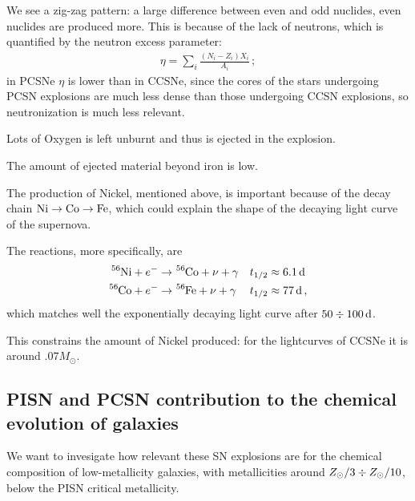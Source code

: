 \documentclass[main.tex]{subfiles}
\begin{document}
We see a zig-zag pattern: a large difference between even and odd nuclides,
even nuclides are produced more.
This is because of the lack of neutrons, which is quantified by the neutron excess parameter: 
%
\begin{align}
\eta = \sum _{i} \frac{(N_i - Z_i)X_i}{A_i}
\,;
\end{align}
%
in PCSNe \(\eta \) is lower than in CCSNe, since 
the cores of the stars undergoing PCSN explosions are much less dense than those undergoing CCSN explosions, so neutronization is much less relevant.

Lots of Oxygen is left unburnt and thus is ejected in the explosion.

The amount of ejected material beyond iron is low. 

The production of Nickel, mentioned above, is important because of the decay chain \(\ce{Ni} \rightarrow \ce{Co} \rightarrow \ce{Fe}\), which could explain the shape of the decaying light curve of the supernova.

The reactions, more specifically, are 
%
\begin{subequations}
\begin{align}
\ce{^{56}Ni} + e^{-} &\rightarrow \ce{^{56}Co} + \nu + \gamma  && t_{1/2} \approx \SI{6.1}{d}   \\
\ce{^{56}Co} + e^{-} &\rightarrow \ce{^{56}Fe} + \nu + \gamma && t_{1/2} \approx \SI{77}{d} 
\,,
\end{align}
\end{subequations}
%
which matches well the exponentially decaying light curve after \(50 \divisionsymbol \SI{100}{d}\).

This constrains the amount of Nickel produced: for the lightcurves of CCSNe it is around \(\num{.07}M_{\odot}\).

\subsection{PISN and PCSN contribution to the chemical evolution of galaxies}

We want to invesigate how relevant these SN explosions are for the chemical composition of low-metallicity galaxies, with metallicities around \(Z_{\odot} / 3 \divisionsymbol Z_{\odot} / 10\), below the PISN critical metallicity. 

\end{document}

